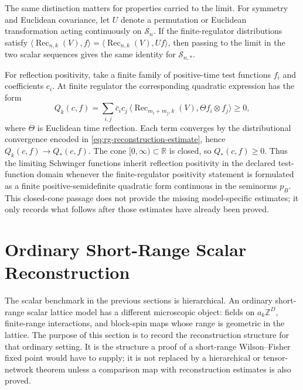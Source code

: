 The same distinction matters for properties carried to the limit.  For
symmetry and Euclidean covariance, let \(U\) denote a permutation or Euclidean
transformation acting continuously on \(\mathcal S_n\).  If the finite-regulator
distributions satisfy
\(\langle \operatorname{Rec}_{n,k}(V),f\rangle
=\langle \operatorname{Rec}_{n,k}(V),Uf\rangle\), then passing to the limit
in the two scalar sequences gives the same identity for
\(\mathcal S_{n,\ast}\).

For reflection positivity, take a finite family of positive-time test functions
\(f_i\) and coefficients \(c_i\).  At finite regulator the corresponding
quadratic expression has the form
\begin{equation}
  Q_k(c,f)=
  \sum_{i,j}\bar c_i c_j\,
  \bigl\langle
    \operatorname{Rec}_{m_i+m_j,k}(V),
    \Theta f_i\otimes f_j
  \bigr\rangle
  \geq0 ,
  \label{eq:rg-reflection-positivity-closed-limit}
\end{equation}
where \(\Theta\) is Euclidean time reflection.  Each term converges by the
distributional convergence encoded in
\eqref{eq:rg-reconstruction-estimate}, hence \(Q_k(c,f)\to Q_\ast(c,f)\).  The
cone \([0,\infty)\subset\mathbb R\) is closed, so \(Q_\ast(c,f)\geq0\).  Thus
the limiting Schwinger functions inherit reflection positivity in the declared
test-function domain whenever the finite-regulator positivity statement is
formulated as a finite positive-semidefinite quadratic form continuous in the
seminorms \(p_B\).  This closed-cone passage does not provide the missing
model-specific estimates; it only records what follows after those estimates
have already been proved.

\section{Ordinary Short-Range Scalar Reconstruction}
\label{sec:ordinary-short-range-scalar-rg-reconstruction}

The scalar benchmark in the previous sections is hierarchical.  An ordinary
short-range scalar lattice model has a different microscopic object: fields
on \(a_k\mathbb Z^D\), finite-range interactions, and block-spin maps whose
range is geometric in the lattice.  The purpose of this section is to record
the reconstruction structure for that ordinary setting.  It is the structure a
proof of a short-range Wilson--Fisher fixed point would have to supply; it is not
replaced by a hierarchical or tensor-network theorem unless a comparison
map with reconstruction estimates is also proved.

